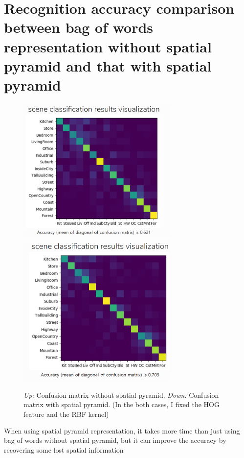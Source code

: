 \section*{Recognition accuracy comparison between bag of words representation without spatial pyramid and that with spatial pyramid}
\begin{figure}[h]
    \centering
    \includegraphics[width=8cm]{confubow.png}
    \includegraphics[width=8cm]{confubest.png}
    \caption{\emph{Up:} Confusion matrix without spatial pyramid. \emph{Down:} Confusion matrix with spatial pyramid. (In the both cases, I fixed the HOG feature and the RBF kernel)}
    \label{fig:result1}
\end{figure}

When using spatial pyramid representation, it takes more time than just using bag of words without spatial pyramid, but it can improve the accuracy by recovering some lost spatial information

 